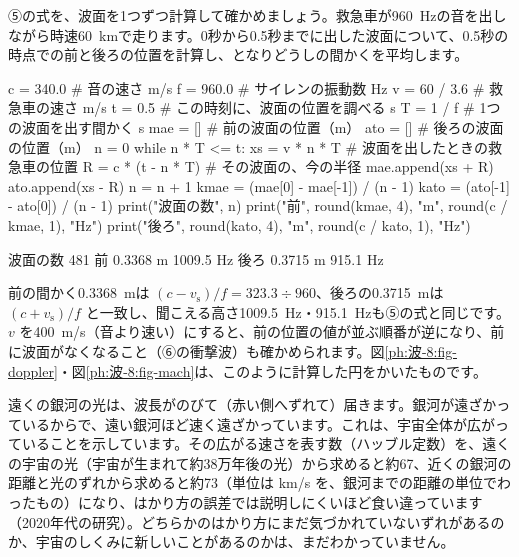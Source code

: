 ⑤の式を、波面を1つずつ計算して確かめましょう。救急車が\qty{960}{Hz}の音を出しながら時速\qty{60}{km}で走ります。0秒から0.5秒までに出した波面について、0.5秒の時点での前と後ろの位置を計算し、となりどうしの間かくを平均します。
\begin{phcode}[Python]
c = 340.0              \# 音の速さ m/s
f = 960.0              \# サイレンの振動数 Hz
v = 60 / 3.6           \# 救急車の速さ m/s
t = 0.5                \# この時刻に、波面の位置を調べる s
T = 1 / f              \# 1つの波面を出す間かく s
mae = []               \# 前の波面の位置（m）
ato = []               \# 後ろの波面の位置（m）
n = 0
while n * T <= t:
    xs = v * n * T         \# 波面を出したときの救急車の位置
    R = c * (t - n * T)    \# その波面の、今の半径
    mae.append(xs + R)
    ato.append(xs - R)
    n = n + 1
kmae = (mae[0] - mae[-1]) / (n - 1)
kato = (ato[-1] - ato[0]) / (n - 1)
print("波面の数", n)
print("前", round(kmae, 4), "m", round(c / kmae, 1), "Hz")
print("後ろ", round(kato, 4), "m", round(c / kato, 1), "Hz")
\end{phcode}
\begin{phcodeout}
波面の数 481
前 0.3368 m 1009.5 Hz
後ろ 0.3715 m 915.1 Hz
\end{phcodeout}
前の間かく\qty{0.3368}{m}は $(c-v_{\mathrm s})/f=323.3\div960$、後ろの\qty{0.3715}{m}は $(c+v_{\mathrm s})/f$ と一致し、聞こえる高さ\qty{1009.5}{Hz}・\qty{915.1}{Hz}も⑤の式と同じです。$v$ を\qty{400}{m/s}（音より速い）にすると、前の位置の値が並ぶ順番が逆になり、前に波面がなくなること（⑥の衝撃波）も確かめられます。図\ref{ph:波-8:fig-doppler}・図\ref{ph:波-8:fig-mach}は、このように計算した円をかいたものです。

\begin{phmodel}[ドップラー効果の式]
\end{phmodel}

\begin{phmada}
遠くの銀河の光は、波長がのびて（赤い側へずれて）届きます。銀河が遠ざかっているからで、遠い銀河ほど速く遠ざかっています。これは、宇宙全体が広がっていることを示しています。その広がる速さを表す数（ハッブル定数）を、遠くの宇宙の光（宇宙が生まれて約38万年後の光）から求めると約67、近くの銀河の距離と光のずれから求めると約73（単位は km/s を、銀河までの距離の単位でわったもの）になり、はかり方の誤差では説明しにくいほど食い違っています（2020年代の研究）。どちらかのはかり方にまだ気づかれていないずれがあるのか、宇宙のしくみに新しいことがあるのかは、まだわかっていません。
\end{phmada}

